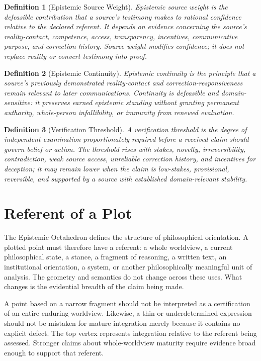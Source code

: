 \documentclass[11pt]{article}
\newtheorem{definition}{Definition}
\begin{document}
\begin{definition}[Epistemic Source Weight]
Epistemic source weight is the defeasible contribution that a source's testimony makes to rational confidence relative to the declared referent. It depends on evidence concerning the source's reality-contact, competence, access, transparency, incentives, communicative purpose, and correction history. Source weight modifies confidence; it does not replace reality or convert testimony into proof.
\end{definition}

\begin{definition}[Epistemic Continuity]
Epistemic continuity is the principle that a source's previously demonstrated reality-contact and correction-responsiveness remain relevant to later communications. Continuity is defeasible and domain-sensitive: it preserves earned epistemic standing without granting permanent authority, whole-person infallibility, or immunity from renewed evaluation.
\end{definition}

\begin{definition}[Verification Threshold]
A verification threshold is the degree of independent examination proportionately required before a received claim should govern belief or action. The threshold rises with stakes, novelty, irreversibility, contradiction, weak source access, unreliable correction history, and incentives for deception; it may remain lower when the claim is low-stakes, provisional, reversible, and supported by a source with established domain-relevant stability.
\end{definition}

\section{Referent of a Plot}

The Epistemic Octahedron defines the structure of philosophical orientation. A plotted point must therefore have a referent: a whole worldview, a current philosophical state, a stance, a fragment of reasoning, a written text, an institutional orientation, a system, or another philosophically meaningful unit of analysis. The geometry and semantics do not change across these uses. What changes is the evidential breadth of the claim being made.

A point based on a narrow fragment should not be interpreted as a certification of an entire enduring worldview. Likewise, a thin or underdetermined expression should not be mistaken for mature integration merely because it contains no explicit defect. The top vertex represents integration relative to the referent being assessed. Stronger claims about whole-worldview maturity require evidence broad enough to support that referent.
\end{document}
